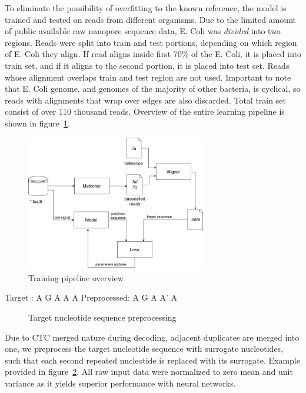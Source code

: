 \documentclass[runningheads,a4paper]{llncs}
\begin{document}
To eliminate the possibility of overfitting to the known reference, the model is trained and tested on reads from different organisms. Due to the limited amount of public available raw nanopore sequence data, E. Coli was \emph{divided} into two regions.
Reads were split into train and test portions, depending on which region of E. Coli they align.
If read aligns inside first 70\% of the E. Coli, it is placed into train set, and if it aligns to the second portion, it is placed into test set. Reads whose alignment overlaps train and test region are not used. Important to note that E. Coli genome, and genomes of the majority of other bacteria, is cyclical, so reads with alignments that wrap over edges are also discarded. Total train set consist of over 110 thousand reads.
Overview of the entire learning pipeline is shown in figure~\ref{fg:train_pipe}.

\begin{figure}[!ht]
    \begin{center}
        \includegraphics[width=0.7\textwidth]{./imgs/train_pipeline.png}
        \caption{Training pipeline overview}
        \label{fg:train_pipe}
    \end{center}
\end{figure}

\begin{verbbox}
    Target      :  A  G  A  A  A
    Preprocessed:  A  G  A  A' A
\end{verbbox}

\begin{figure}[!h]
    \centering
    \theverbbox
    \caption{Target nucleotide sequence preprocessing}
    \label{fig:data_preprocessing}
\end{figure}

Due to CTC merged nature during decoding, adjacent duplicates are merged into one, we preprocess the target nucleotide sequence with surrogate nucleotides, such that each second repeated nucleotide is replaced with its surrogate. Example provided in figure~\ref{fig:data_preprocessing}. All raw input data were normalized to zero mean and unit variance as it yields superior performance with neural networks.
\end{document}
